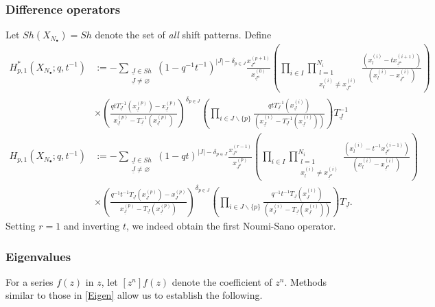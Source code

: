 \documentclass{amsart}
\renewcommand{\triangle}{\vartriangle}
\newcommand{\Ju}{{\underline{J}}}
\theoremstyle{remark}
\numberwithin{thm}{section}
\numberwithin{equation}{section}
\begin{document}
\subsubsection{Difference operators} Let $Sh(X_{N_\bullet})=Sh$ denote the set of \textit{all} shift patterns. Define
\begin{align*}
H_{p,1}^*(X_{N_\bullet};q,t^{-1})
&:= 
-\sum_{\substack{\Ju\in Sh\\\Ju\not=\varnothing}}(1-q^{-1}t^{-1})^{|J|-\delta_{p\in J}}
\frac{x^{(p+1)}_{\Ju^{\triangle}}}{x^{(0)}_{\Ju^{\triangle}}}
\left( \prod_{i\in I}\prod_{\substack{l=1\\ x^{(i)}_{l}\not=x^{(i)}_{\Ju^\triangle}}}^{N_i}\frac{\left(x_{l}^{(i)}-tx^{(i+1)}_{\Ju^\triangle}\right)}{\left(x_{l}^{(i)}-x^{(i)}_{\Ju^\triangle}\right)} \right)\\
&\times
\left( \frac{qtT_{\Ju}^{-1}(x^{(p)}_{\Ju})-x^{(p)}_{\Ju}}{x^{(p)}_{\Ju}-T_{\Ju}^{-1}(x^{(p)}_{\Ju})} \right)^{\delta_{p\in J}}
\left(\prod_{i\in J\backslash\{p\}}\frac{qtT_{\Ju}^{-1}(x^{(i)}_{\Ju})}{\left(x^{(i)}_{\Ju}-T_\Ju^{-1} (x^{(i)}_{\Ju})\right)}\right)
T_{\Ju}^{-1}\\
H_{p,1}(X_{N_\bullet};q,t^{-1})
&:=
-\sum_{\substack{\Ju\in Sh\\\Ju\not=\varnothing}} (1-qt)^{|J|-\delta_{p\in J}}
\frac{x^{(r-1)}_{\Ju^{\triangledown}}}{x^{(p)}_{\Ju^{\triangledown}}}
\left(\prod_{i\in I}\prod_{\substack{l=1\\ x^{(i)}_{l}\not= x^{(i)}_{\Ju^{\triangledown}}}}^{N_i}
\frac{\left(x^{(i)}_{l}-t^{-1}x^{(i-1)}_{\Ju^{\triangledown}}\right)}{\left(x^{(i)}_{l}-x^{(i)}_{\Ju^{\triangledown}}\right)}\right)\\
&\times\left( \frac{q^{-1}t^{-1}T_{\Ju}(x^{(p)}_{\Ju})-x^{(p)}_{\Ju}}{x^{(p)}_{\Ju}-T_{\Ju}(x^{(p)}_{\Ju})} \right)^{\delta_{p\in J}}
\left(\prod_{i\in J\backslash\{p\}}\frac{q^{-1}t^{-1}T_{\Ju}(x^{(i)}_{\Ju})}{\left(x^{(i)}_{\Ju}-T_\Ju (x^{(i)}_{\Ju})\right)}\right)
T_{\Ju}.
\end{align*}
Setting $r=1$ and inverting $t$, we indeed obtain the first Noumi-Sano operator.

\subsubsection{Eigenvalues}
For a series $f(z)$ in $z$, let $[z^n] f(z)$ denote the coefficient of $z^n$.
Methods similar to those in \ref{Eigen} allow us to establish the following.
\end{document}
